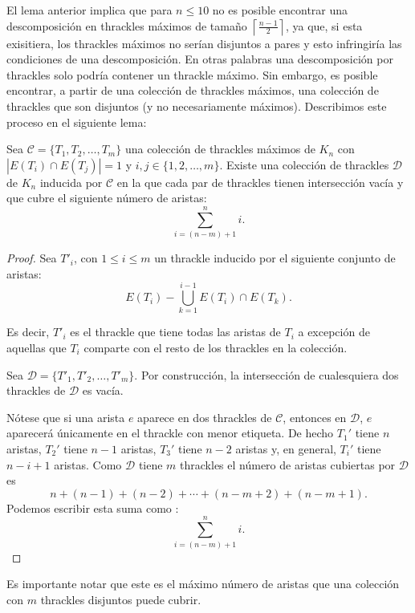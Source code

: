   El lema anterior implica que para $n\leq 10$ no es posible encontrar una
  descomposición en thrackles máximos de tamaño
  $\left\lceil\frac{n-1}{2}\right\rceil$, ya que, si esta exisitiera, los
  thrackles máximos no serían disjuntos a pares y esto infringiría las
  condiciones de una descomposición.
  En otras palabras una descomposición por thrackles solo podría contener un
  thrackle máximo. Sin embargo, es posible encontrar, a partir de una colección
  de thrackles máximos, una colección de thrackles que son disjuntos (y no necesariamente máximos).
  Describimos este proceso en el siguiente lema:
  \begin{lemma}\label{lema:existedescomp}
    Sea $\mathcal{C}=\{T_1,T_2,\dots,T_m\}$ una colección de thrackles máximos
    de $K_n$ con $|E(T_i)\cap E(T_j)| = 1$ y $ i,j \in \{1,2,\dots,m\}$.
    Existe una colección  de thrackles $\mathcal{D}$ de $K_n$ inducida por
    $\mathcal{C}$ en la que cada par de thrackles tienen intersección vacía y que
    cubre el siguiente número de aristas:
    \[\displaystyle \sum^n_{i=(n-m) + 1}i.\]
  \end{lemma}
  \begin{proof}
    Sea $T'_i$, con $1 \leq i \leq m$ un thrackle inducido por el siguiente
    conjunto de aristas:
    \[E(T_i) - \bigcup_{k=1}^{i-1} E(T_i)\cap E(T_k).\]

    Es decir, $T'_i$ es el thrackle que tiene todas las aristas de $T_i$
    a excepción de aquellas que $T_i$ comparte con el resto de los thrackles
    en la colección.

    Sea $\mathcal{D}=\{T'_1,T'_2,\dots,T'_m\}$. Por construcción, la intersección
    de cualesquiera dos thrackles de $\mathcal{D}$ es vacía.

    Nótese que si una arista $e$ aparece en dos thrackles de $\mathcal{C}$,
    entonces en $\mathcal{D}$, $e$ aparecerá únicamente en el thrackle con menor
    etiqueta.
    De hecho $T_1'$ tiene $n$ aristas, $T_2'$ tiene $n-1$ aristas, $T_3'$ tiene
    $n-2$ aristas y, en general, $T_i'$ tiene $n-i+1$ aristas. Como $\mathcal{D}$
    tiene $m$ thrackles el número de aristas cubiertas por $\mathcal{D}$ es
    \[ n + (n-1) + (n-2) + \cdots + (n- m + 2) + (n - m + 1).\]
    Podemos escribir esta suma como :
    \[\displaystyle \sum^n_{i=(n-m) + 1}i.\]
  \end{proof}
  Es importante notar que este es el máximo número de aristas que una colección
  con $m$ thrackles disjuntos puede cubrir.

